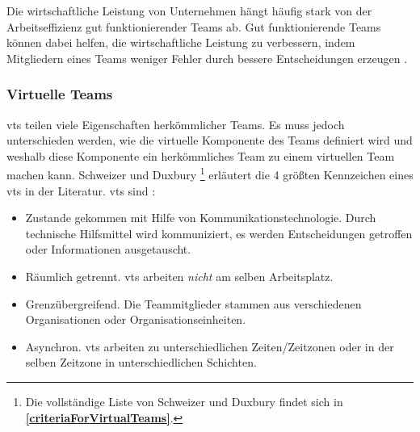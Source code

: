\documentclass[a4paper,11pt]{article}%
\renewcommand{\\}{\vspace*{0.5\baselineskip} \newline}
\begin{document}
Die wirtschaftliche Leistung von Unternehmen hängt häufig stark von der Arbeitseffizienz gut funktionierender Teams ab. Gut funktionierende Teams können dabei helfen, die wirtschaftliche Leistung zu verbessern, indem Mitgliedern eines Teams weniger Fehler durch bessere Entscheidungen erzeugen \citep[p. 1-6]{biech2007pfeiffer}. 
 
%

		


\subsubsection{Virtuelle Teams}
\label{vts}

\ac{vts} teilen viele Eigenschaften herkömmlicher Teams. Es muss jedoch unterschieden werden, wie die virtuelle Komponente des Teams definiert wird und weshalb diese Komponente ein herkömmliches Team zu einem virtuellen Team machen kann. 
\label{AnforderungenLautSchweitzer}
Schweizer und Duxbury \citep[p.270]{schweitzer2010conceptualizing}\footnote{Die vollständige Liste von Schweizer und Duxbury findet sich in \textbf{\autoref{criteriaForVirtualTeams}}.} erläutert die 4 größten Kennzeichen eines \ac{vts} in der Literatur.
\ac{vts} sind :
\begin{itemize}
\item Zustande gekommen mit Hilfe von Kommunikationstechnologie. Durch technische Hilfsmittel wird kommuniziert, es werden Entscheidungen getroffen oder Informationen ausgetauscht.
\item Räumlich getrennt. \ac{vts} arbeiten \textit{nicht} am selben Arbeitsplatz.
\item Grenzübergreifend. Die Teammitglieder stammen aus verschiedenen Organisationen oder Organisationseinheiten.
\item Asynchron. \ac{vts} arbeiten zu unterschiedlichen Zeiten/Zeitzonen oder in der selben Zeitzone in unterschiedlichen Schichten.
\end{itemize}
\end{document}
